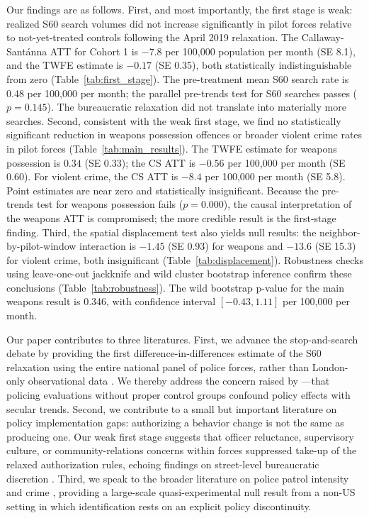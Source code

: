 \documentclass[12pt]{article}
\begin{document}
Our findings are as follows. First, and most importantly, the first stage is weak: realized S60 search volumes did not increase significantly in pilot forces relative to not-yet-treated controls following the April 2019 relaxation. The Callaway-Sant\'{a}nna ATT for Cohort 1 is $-7.8$ per 100,000 population per month (SE 8.1), and the TWFE estimate is $-0.17$ (SE 0.35), both statistically indistinguishable from zero (Table~\ref{tab:first_stage}). The pre-treatment mean S60 search rate is 0.48 per 100,000 per month; the parallel pre-trends test for S60 searches passes ($p = 0.145$). The bureaucratic relaxation did not translate into materially more searches. Second, consistent with the weak first stage, we find no statistically significant reduction in weapons possession offences or broader violent crime rates in pilot forces (Table~\ref{tab:main_results}). The TWFE estimate for weapons possession is $0.34$ (SE 0.33); the CS ATT is $-0.56$ per 100,000 per month (SE 0.60). For violent crime, the CS ATT is $-8.4$ per 100,000 per month (SE 5.8). Point estimates are near zero and statistically insignificant. Because the pre-trends test for weapons possession fails ($p = 0.000$), the causal interpretation of the weapons ATT is compromised; the more credible result is the first-stage finding. Third, the spatial displacement test also yields null results: the neighbor-by-pilot-window interaction is $-1.45$ (SE 0.93) for weapons and $-13.6$ (SE 15.3) for violent crime, both insignificant (Table~\ref{tab:displacement}). Robustness checks using leave-one-out jackknife and wild cluster bootstrap inference confirm these conclusions (Table~\ref{tab:robustness}). The wild bootstrap p-value for the main weapons result is 0.346, with confidence interval $[-0.43, 1.11]$ per 100,000 per month.

Our paper contributes to three literatures. First, we advance the stop-and-search debate by providing the first difference-in-differences estimate of the S60 relaxation using the entire national panel of police forces, rather than London-only observational data \citep{tiratelli2018, delsol2015, shiner2015}. We thereby address the concern raised by \citet{bragatactics2019}---that policing evaluations without proper control groups confound policy effects with secular trends. Second, we contribute to a small but important literature on policy implementation gaps: authorizing a behavior change is not the same as producing one. Our weak first stage suggests that officer reluctance, supervisory culture, or community-relations concerns within forces suppressed take-up of the relaxed authorization rules, echoing findings on street-level bureaucratic discretion \citep{lipsky1980}. Third, we speak to the broader literature on police patrol intensity and crime \citep{macdonald2016, chalfin2022, weisburd2015}, providing a large-scale quasi-experimental null result from a non-US setting in which identification rests on an explicit policy discontinuity.
\end{document}
